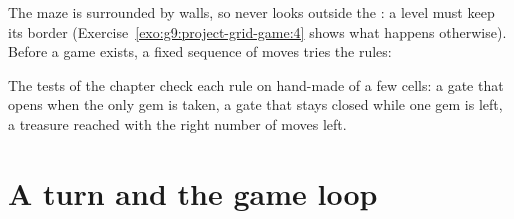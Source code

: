 \label{lst:g9:project-grid-game:v4}

The maze is surrounded by walls, so  never looks outside the
: a level must keep its border (Exercise~\ref{exo:g9:project-grid-game:4}
shows what happens otherwise). Before a game  exists, a fixed sequence of
moves tries the rules:

\label{lst:g9:project-grid-game:v4-main}

\label{out:g9:project-grid-game:v4}

The tests of the chapter check each rule on hand-made  of a few cells: a
gate that opens when the only gem is taken, a gate that stays closed while one
gem is left, a treasure reached with the right number of moves left.

\section{A turn and the game loop}

